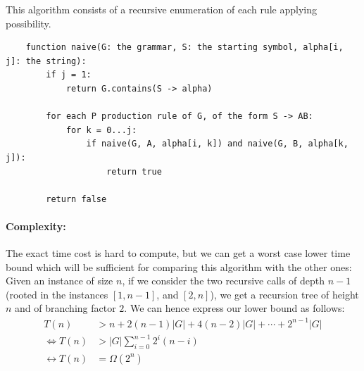 \documentclass[twocolumn]{article}
\begin{document}
This algorithm consists of a recursive enumeration of each rule applying possibility.

\begin{lstlisting}
    function naive(G: the grammar, S: the starting symbol, alpha[i, j]: the string):
        if j = 1:
            return G.contains(S -> alpha)

        for each P production rule of G, of the form S -> AB:
            for k = 0...j:
                if naive(G, A, alpha[i, k]) and naive(G, B, alpha[k, j]):
                    return true

        return false
\end{lstlisting}

\paragraph{Complexity:}
The exact time cost is hard to compute, but we can get a worst case lower time bound which
will be sufficient for comparing this algorithm with the other ones:\\
Given an instance of size $n$, if we consider the two recursive calls of depth
$n-1$ (rooted in the instances $[1, n-1]$, and $[2, n]$), we get a recursion tree of height $n$ and of branching factor $2$. We can
hence express our lower bound as follows:\\
\begin{align*}
  T(n) &> n+2(n-1)|G|+4(n-2)|G|+\cdots +2^{n-1}|G|\\
  \Leftrightarrow T(n) &>|G|\displaystyle\sum_{i=0}^{n-1}2^i(n-i)\\
  \leftrightarrow T(n) &=\Omega(2^n)
\end{align*}

\end{document}
